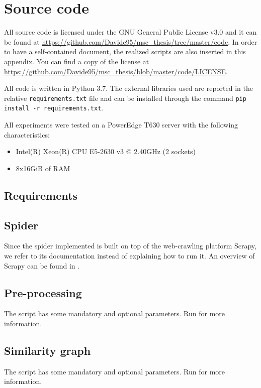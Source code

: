 \chapter{Source code}
All source code is licensed under the GNU General Public License v3.0 and it can be found at \url{https://github.com/Davide95/msc_thesis/tree/master/code}.
In order to have a self-contained document, the realized scripts are also inserted in this appendix.
You can find a copy of the license at \url{https://github.com/Davide95/msc_thesis/blob/master/code/LICENSE}.

All code is written in Python 3.7. The external libraries used are reported in the relative \texttt{requirements.txt} file and can be installed through the command \texttt{pip install -r requirements.txt}.

All experiments were tested on a PowerEdge T630 server with the following characteristics:
\begin{itemize}
    \item Intel(R) Xeon(R) CPU E5-2630 v3 @ 2.40GHz (2 sockets)
    \item 8x16GiB of RAM
\end{itemize}

\section{Requirements}
\begin{minipage}{\linewidth}
    
\end{minipage}

\pagebreak
\section{Spider} \label{spider}

Since the spider implemented is built on top of the web-crawling platform Scrapy, we refer to its documentation instead of explaining how to run it.
An overview of Scrapy can be found in \cite{kouzis2016learning}.



\pagebreak
\section{Pre-processing} \label{preprocessing}
The script has some mandatory and optional parameters. 
Run  for more information.



\pagebreak
\section{Similarity graph}
The script has some mandatory and optional parameters. 
Run  for more information.

